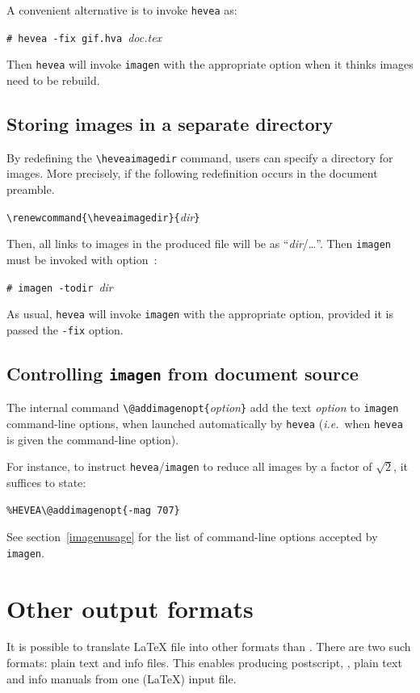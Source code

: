 A convenient alternative is to invoke \texttt{hevea} as:
\begin{flushleft}
\texttt{\#~hevea~-fix~gif.hva}~\textit{doc.tex}
\end{flushleft}
Then \texttt{hevea} will invoke \texttt{imagen} with the appropriate
option when it thinks images need to be rebuild.


\subsection{Storing images in a separate directory}
By redefining the \verb+\heveaimagedir+ command, users can specify a
directory for images.
More precisely, if the following redefinition occurs in the document
preamble.
\begin{flushleft}
\verb+\renewcommand{\heveaimagedir}{+\textit{dir}\verb+}+
\end{flushleft}
Then, all links to images in the produced \html{} file will be as
``\textit{dir}/\ldots''.
Then \texttt{imagen} must be invoked with option~:
\begin{flushleft}
\texttt{\#~imagen~-todir}~\textit{dir}~
\end{flushleft}
As usual, \texttt{hevea} will invoke \texttt{imagen} with the
appropriate option, provided it is passed the \texttt{-fix} option.


\subsection{Controlling\label{imagen-source} \texttt{imagen} from document source}
The internal command
\verb+\@addimagenopt{+\textit{option}\verb+}+ add
the text \textit{option} to \texttt{imagen} command-line options, when
launched automatically by \texttt{hevea} (\emph{i.e.}\ when
\texttt{hevea} is given the  command-line option).

For instance, to instruct \texttt{hevea}/\texttt{imagen} to
reduce all images by a factor of $\sqrt{2}$, it suffices to state:
\begin{flushleft}
\texttt{\%HEVEA}\verb+\@addimagenopt{-mag 707}+
\end{flushleft}
See section~\ref{imagenusage} for the list of command-line options
accepted by \texttt{imagen}.

\section{Other \label{alternative}output formats}
It is possible to translate \LaTeX{} file into other formats than
\html. There are two such formats: plain text and info files.
This enables producing postscript,
\html, plain text and info manuals from one (\LaTeX) input file.

